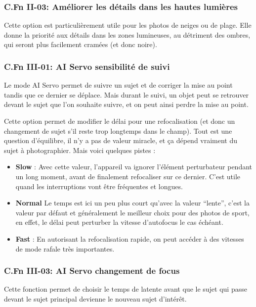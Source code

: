 \documentclass[a4paper,twoside]{article}
\begin{document}
\subsubsection{C.Fn II-03: Améliorer les détails dans les hautes lumières}
Cette option est particulièrement utile pour les photos de neiges ou de plage. Elle donne la priorité aux détails dans les zones lumineuses, au détriment des ombres, qui seront plus facilement cramées (et donc noire).

\subsubsection{C.Fn III-01: AI Servo sensibilité de suivi}
Le mode AI Servo permet de suivre un sujet et de corriger la mise au point tandis que ce dernier se déplace. Mais durant le suivi, un objet peut se retrouver devant le sujet que l'on souhaite suivre, et on peut ainsi perdre la mise au point. 

Cette option permet de modifier le délai pour une refocalisation (et donc un changement de sujet s'il reste trop longtemps dans le champ). Tout est une question d'équilibre, il n'y a pas de valeur miracle, et ça dépend vraiment du sujet à photographier. Mais voici quelques pistes : 
\begin{itemize}
\item \textbf{Slow} : Avec cette valeur, l'appareil va ignorer l'élément perturbateur pendant un long moment, avant de finalement refocaliser sur ce dernier. C'est utile quand les interruptions vont être fréquentes et longues. 
\item \textbf{Normal} Le temps est ici un peu plus court qu'avec la valeur ``lente'', c'est la valeur par défaut et généralement le meilleur choix pour des photos de sport, en effet, le délai peut perturber la vitesse d'autofocus le cas échéant.
\item \textbf{Fast} : En autorisant la refocalisation rapide, on peut accéder à des vitesses de mode rafale très importantes. 
\end{itemize}


\subsubsection{C.Fn III-03: AI Servo changement de focus}
Cette fonction permet de choisir le temps de latente avant que le sujet qui passe devant le sujet principal devienne le nouveau sujet d'intérêt.
\end{document}
